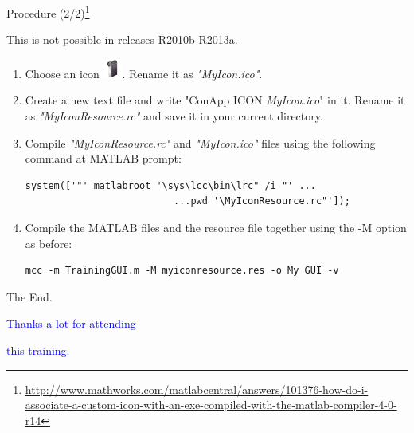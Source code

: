 \documentclass[10pt, english, notes]{beamer}
\begin{document}
\begin{frame}[fragile]{Procedure (2/2)\footnote{\url{http://www.mathworks.com/matlabcentral/answers/101376-how-do-i-associate-a-custom-icon-with-an-exe-compiled-with-the-matlab-compiler-4-0-r14}}}
\begin{alertblock}{}
\centering
This is not possible in releases R2010b-R2013a.
\end{alertblock}
\begin{enumerate}
\item Choose an icon \includegraphics[scale = 0.4, angle = 0]{GUI/MyIcon}. Rename it as \emph{"MyIcon.ico"}.
\item Create a new text file and write \alert{"ConApp ICON \emph{MyIcon.ico}"} in it. Rename it as \emph{"MyIconResource.rc"} and save it in your current directory.
\item Compile \emph{"MyIconResource.rc"} and \emph{"MyIcon.ico"} files using the following command at MATLAB prompt:
\begin{verbatim}
system(['"' matlabroot '\sys\lcc\bin\lrc" /i "' ...
                          ...pwd '\MyIconResource.rc"']);
\end{verbatim}
\item Compile the MATLAB files and the resource file together using the -M option as before:
\begin{verbatim}
mcc -m TrainingGUI.m -M myiconresource.res -o My GUI -v
\end{verbatim}
\end{enumerate}
\end{frame}
\begin{frame}{The End.}
\thispagestyle{empty}
\begin{center}
\textcolor{blue}{\Huge Thanks a lot for attending~}
\par
\textcolor{blue}{\Huge this training.}
\end{center}
\end{frame}
\end{document}
